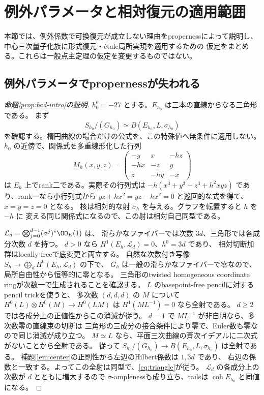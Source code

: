 \section{例外パラメータと相対復元の適用範囲}\label{sec:scope}

本節では、例外係数で可換復元が成立しない理由をpropernessによって説明し、
中心三次量子化族に形式復元・étale局所実現を適用するための
仮定をまとめる。これらは一般点主定理の仮定を変更するものではない。

\subsection{例外パラメータでpropernessが失われる}

\begin{proof}[命題\ref{prop:bad-intro}の証明]
 \(h_0^6=-27\) とする。\(E_{h_0}\) は三本の直線からなる三角形である。
 まず
 \[
 S_{h_0}/(G_{h_0})\simeq B(E_{h_0},L,\sigma_{h_0})                 \tag{6}\label{eq:triangle}
 \]
 を確認する。楕円曲線の場合だけの公式を、この特殊値へ無条件に適用しない。
 \(h_0\) の近傍で、関係式を多重線形化した行列
 \[
 M_h(x,y,z)=
 \begin{pmatrix}-y&x&-hz\\-hx&-z&y\\z&-hy&-x\end{pmatrix}
 \]
 は \(E_h\) 上でrank二である。実際その行列式は
 \(-h(x^3+y^3+z^3+h^2xyz)\) であり、rank一なら小行列式から
 \(yz+hx^2=yz-hx^2=0\) と巡回的な式を得て、\(x=y=z=0\) となる。
 核は相対的な射 \(\sigma_h\) を与える。グラフを転置すると \(h\) を \(-h\) に
 変える同じ関係式になるので、この射は相対自己同型である。

 \(\mathcal L_d=\bigotimes_{j=0}^{d-1}(\sigma^j)^*\OO_E(1)\) は、
 滑らかなファイバーでは次数 \(3d\)、三角形では各成分次数 \(d\) を持つ。
 \(d>0\) なら \(H^1(E_h,\mathcal L_d)=0\)、\(h^0=3d\) であり、
 相対切断加群はlocally freeで底変更と両立する。
 自然な次数付き写像 \(S_h\to\bigoplus_dH^0(E_h,\mathcal L_d)\) の下で、
 \(G_h\) は一般の滑らかなファイバーで零なので、局所自由性から恒等的に零となる。
 三角形のtwisted homogeneous coordinate ringが次数一で生成されることを確認する。
 \(L\) のbasepoint-free pencilに対するpencil trickを使うと、
 多次数 \((d,d,d)\) の \(M\) について
 \(H^0(L)\otimes H^0(M)\to H^0(LM)\) は
 \(H^1(ML^{-1})=0\) なら全射である。
 \(d\ge2\) では各成分上の正値性からこの消滅が従う。
 \(d=1\) で \(ML^{-1}\) が非自明なら、多次数零の直線束の切断は
 三角形の三成分の接合条件により零で、Euler数も零なので同じ消滅が成り立つ。
 \(M\simeq L\) なら、平面三次曲線の斉次イデアルに二次式がないことから全射である。
 従って \(S_{h_0}/(G_{h_0})\to B(E_{h_0},L,\sigma_{h_0})\) は全射である。
 補題\ref{lem:center}の正則性から左辺のHilbert係数は \(1,3d\) であり、
 右辺の係数と一致する。よってこの全射は同型で、\eqref{eq:triangle}が従う。
 \(\mathcal L_d\) の各成分上の次数が \(d\) とともに増大するので
 \(\sigma\)-amplenessも成り立ち、tailsは \(\operatorname{coh}E_{h_0}\) と同値になる。


\end{proof}
